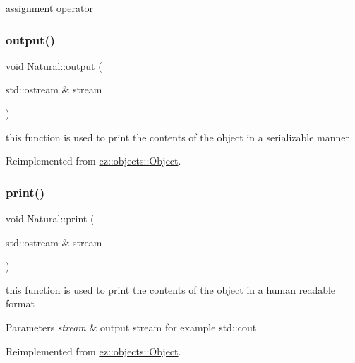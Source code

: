 assignment operator \mbox{\label{classez_1_1objects_1_1Natural_a53b32330fc4911b138033b37b90bc467}} 
\subsubsection{\texorpdfstring{output()}{output()}}
{\footnotesize\ttfamily void Natural\+::output (\begin{DoxyParamCaption}\item[{std\+::ostream \&}]{stream }\end{DoxyParamCaption})\hspace{0.3cm}{\ttfamily [virtual]}}

this function is used to print the contents of the object in a serializable manner 

Reimplemented from \hyperlink{classez_1_1objects_1_1Object_a0fdfe18e6c35d6b0d7e7a01265aded15}{ez\+::objects\+::\+Object}.

\mbox{\label{classez_1_1objects_1_1Natural_ac841a61814757882ad7f2282be3ceb1c}} 
\subsubsection{\texorpdfstring{print()}{print()}}
{\footnotesize\ttfamily void Natural\+::print (\begin{DoxyParamCaption}\item[{std\+::ostream \&}]{stream }\end{DoxyParamCaption})\hspace{0.3cm}{\ttfamily [virtual]}}

this function is used to print the contents of the object in a human readable format 
\begin{DoxyParams}{Parameters}
{\em stream} & output stream for example std\+::cout \\
\hline
\end{DoxyParams}


Reimplemented from \hyperlink{classez_1_1objects_1_1Object_a9e20f39a78163f67f000576149d858b3}{ez\+::objects\+::\+Object}.

